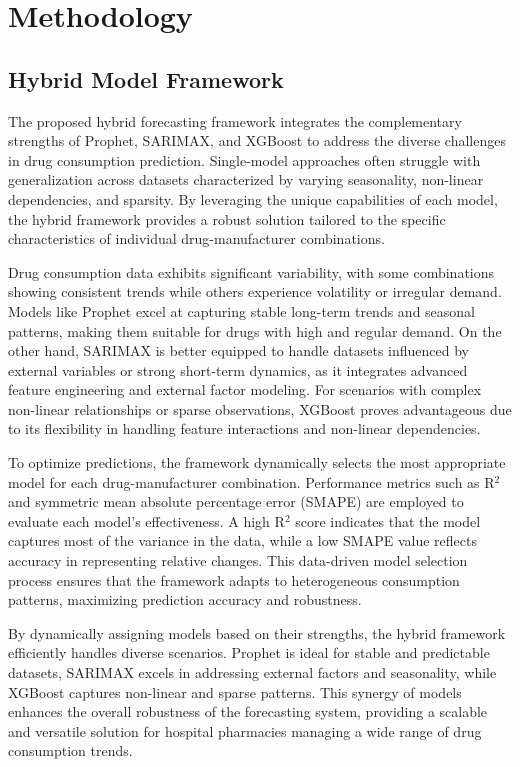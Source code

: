 \documentclass[journal]{IEEEtran}
\begin{document}
\section{Methodology}

\subsection{Hybrid Model Framework}

The proposed hybrid forecasting framework integrates the complementary strengths of Prophet, SARIMAX, and XGBoost to address the diverse challenges in drug consumption prediction. Single-model approaches often struggle with generalization across datasets characterized by varying seasonality, non-linear dependencies, and sparsity. By leveraging the unique capabilities of each model, the hybrid framework provides a robust solution tailored to the specific characteristics of individual drug-manufacturer combinations.

Drug consumption data exhibits significant variability, with some combinations showing consistent trends while others experience volatility or irregular demand. Models like Prophet excel at capturing stable long-term trends and seasonal patterns, making them suitable for drugs with high and regular demand. On the other hand, SARIMAX is better equipped to handle datasets influenced by external variables or strong short-term dynamics, as it integrates advanced feature engineering and external factor modeling. For scenarios with complex non-linear relationships or sparse observations, XGBoost proves advantageous due to its flexibility in handling feature interactions and non-linear dependencies.

To optimize predictions, the framework dynamically selects the most appropriate model for each drug-manufacturer combination. Performance metrics such as R\(^2\) and symmetric mean absolute percentage error (SMAPE) are employed to evaluate each model’s effectiveness. A high R\(^2\) score indicates that the model captures most of the variance in the data, while a low SMAPE value reflects accuracy in representing relative changes. This data-driven model selection process ensures that the framework adapts to heterogeneous consumption patterns, maximizing prediction accuracy and robustness.

By dynamically assigning models based on their strengths, the hybrid framework efficiently handles diverse scenarios. Prophet is ideal for stable and predictable datasets, SARIMAX excels in addressing external factors and seasonality, while XGBoost captures non-linear and sparse patterns. This synergy of models enhances the overall robustness of the forecasting system, providing a scalable and versatile solution for hospital pharmacies managing a wide range of drug consumption trends.
\end{document}
